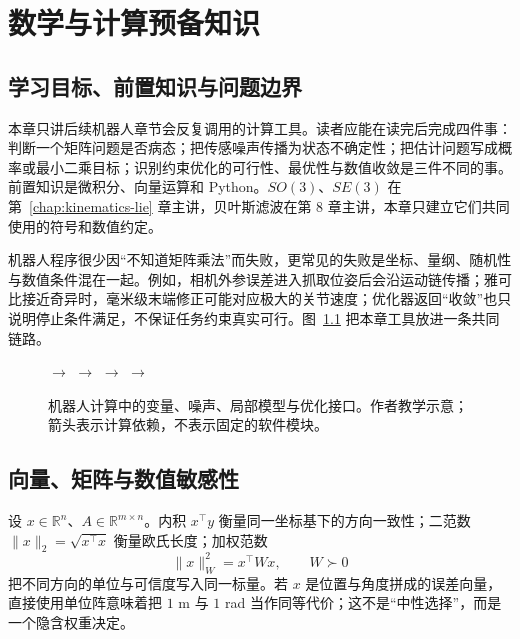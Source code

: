 \chapter{数学与计算预备知识}
\label{chap:math-computation}

\section{学习目标、前置知识与问题边界}

本章只讲后续机器人章节会反复调用的计算工具。读者应能在读完后完成四件事：判断一个矩阵问题是否病态；把传感噪声传播为状态不确定性；把估计问题写成概率或最小二乘目标；识别约束优化的可行性、最优性与数值收敛是三件不同的事。前置知识是微积分、向量运算和 Python。$SO(3)$、$SE(3)$ 在第~\ref{chap:kinematics-lie} 章主讲，贝叶斯滤波在第 8 章主讲，本章只建立它们共同使用的符号和数值约定。

机器人程序很少因“不知道矩阵乘法”而失败，更常见的失败是坐标、量纲、随机性与数值条件混在一起。例如，相机外参误差进入抓取位姿后会沿运动链传播；雅可比接近奇异时，毫米级末端修正可能对应极大的关节速度；优化器返回“收敛”也只说明停止条件满足，不保证任务约束真实可行。图~\ref{fig:math-compute-chain} 把本章工具放进一条共同链路。

\begin{figure}[H]
\centering
\small
{}
$\longrightarrow$
$\longrightarrow$
$\longrightarrow$
$\longrightarrow$
\caption{机器人计算中的变量、噪声、局部模型与优化接口。作者教学示意；箭头表示计算依赖，不表示固定的软件模块。}
\label{fig:math-compute-chain}
\end{figure}

\section{向量、矩阵与数值敏感性}

设 $x\in\mathbb{R}^{n}$、$A\in\mathbb{R}^{m\times n}$。内积 $x^\top y$ 衡量同一坐标基下的方向一致性；二范数 $\lVert x\rVert_2=\sqrt{x^\top x}$ 衡量欧氏长度；加权范数
\begin{equation}
\lVert x\rVert_W^2=x^\top W x,\qquad W\succ0
\label{eq:weighted-norm}
\end{equation}
把不同方向的单位与可信度写入同一标量。若 $x$ 是位置与角度拼成的误差向量，直接使用单位阵意味着把 $1$ m 与 $1$ rad 当作同等代价；这不是“中性选择”，而是一个隐含权重决定。

